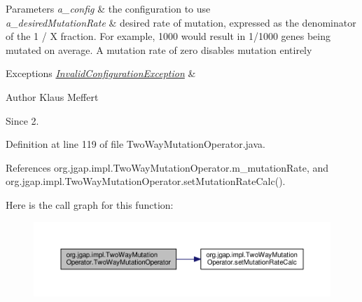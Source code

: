 \begin{DoxyParams}{Parameters}
{\em a\-\_\-config} & the configuration to use \\
\hline
{\em a\-\_\-desired\-Mutation\-Rate} & desired rate of mutation, expressed as the denominator of the 1 / X fraction. For example, 1000 would result in 1/1000 genes being mutated on average. A mutation rate of zero disables mutation entirely \\
\hline
\end{DoxyParams}

\begin{DoxyExceptions}{Exceptions}
{\em \hyperlink{classorg_1_1jgap_1_1_invalid_configuration_exception}{Invalid\-Configuration\-Exception}} & \\
\hline
\end{DoxyExceptions}
\begin{DoxyAuthor}{Author}
Klaus Meffert 
\end{DoxyAuthor}
\begin{DoxySince}{Since}
2. 
\end{DoxySince}


Definition at line 119 of file Two\-Way\-Mutation\-Operator.\-java.



References org.\-jgap.\-impl.\-Two\-Way\-Mutation\-Operator.\-m\-\_\-mutation\-Rate, and org.\-jgap.\-impl.\-Two\-Way\-Mutation\-Operator.\-set\-Mutation\-Rate\-Calc().



Here is the call graph for this function\-:
\nopagebreak
\begin{figure}[H]
\begin{center}
\leavevmode
\includegraphics[width=350pt]{classorg_1_1jgap_1_1impl_1_1_two_way_mutation_operator_a5fb0b818973a6da4aa577fd7e0e7d132_cgraph}
\end{center}
\end{figure}





